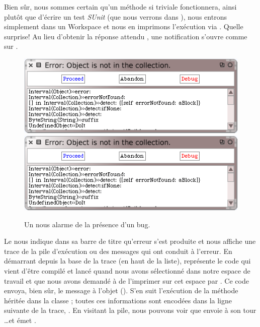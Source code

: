 \documentclass[a4paper,10pt,twoside]{book}
\begin{document}
Bien s\^ur, nous sommes certain qu'un m\'ethode si triviale fonctionnera,
ainsi plut\^ot que d'\'ecrire un test \emph{SUnit} 
(que nous verrons dans ),
nous entrons simplement  dans un Workspace
et nous en imprimons l'ex\'ecution via .
Quelle surprise! Au lieu d'obtenir la r\'eponse attendu , 
une notification  s'ouvre comme sur
.

\begin{figure}[btp]
	\begin{center}
	\ifluluelse
		{\includegraphics[width=\textwidth]{PreDebugWindow}}
		{\includegraphics[scale=0.7]{PreDebugWindow}}
	\end{center}
	\caption{Un  nous alarme de la pr\'esence d'un bug.}
	\label{fig:PreDebugWindow}
\end{figure}

Le  nous indique dans sa barre de titre
qu'erreur s'est produite et nous affiche une trace de la pile d'ex\'ecution
ou  des messages qui ont conduit \`a l'erreur.
En d\'emarrant depuis la base de la trace
(en haut de la liste),
  repr\'esente le code qui vient d'\^etre compil\'e
et lanc\'e quand nous avons s\'electionn\'e  
dans notre espace de travail et que nous avons
demand\'e \`a \sq de l'imprimer sur cet espace par .
Ce code envoya, bien s\^ur, le message  \`a
l'objet  ().
S'en suit l'ex\'ecution de la m\'ethode  h\'erit\'ee dans la
classe ;
toutes ces informations sont encod\'ees dans la ligne suivante de la trace,
.
En visitant la pile, nous pouvons voir que  envoie
\`a son tour \ldots et  \'emet .
\end{document}

